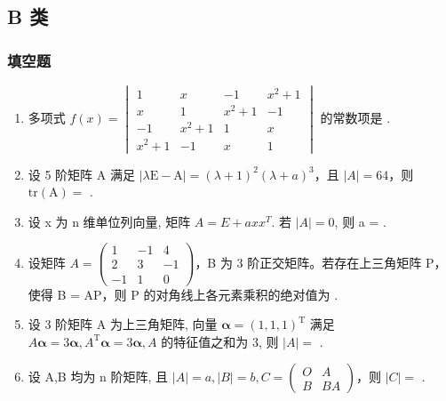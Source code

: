 \documentclass[12pt, a4paper]{ctexart}
\begin{document}
\subsection{B 类}

\subsubsection*{填空题}

\begin{enumerate}
    \item 多项式 $ f(x)=\begin{vmatrix}1&x&-1&x^{2}+1\\x&1&x^{2}+1&-1\\-1&x^{2}+1&1&x\\x^{2}+1&-1&x&1\end{vmatrix} $ 的常数项是 \underline{\hspace{2cm}}.

    \item 设 5 阶矩阵 A 满足 $ \left|\lambda\mathrm{E}-\mathrm{A}\right|=\left(\lambda+1\right)^{2}\left(\lambda+a\right)^{3} $，且 $ \left|A\right|=64 $，则 $ \mathrm{tr}(\mathrm{A})= $ \underline{\hspace{2cm}}.

    \item 设 x 为 n 维单位列向量, 矩阵 $ A = E + a x x^{T} $. 若 $ |A| = 0 $, 则 a = \underline{\hspace{2cm}}.

    \item 设矩阵 $ A = \begin{pmatrix} 1 & -1 & 4 \\ 2 & 3 & -1 \\ -1 & 1 & 0 \end{pmatrix} $，B 为 3 阶正交矩阵。若存在上三角矩阵 P，使得 B = AP，则 P 的对角线上各元素乘积的绝对值为 \underline{\hspace{2cm}}.

    \item 设 3 阶矩阵 A 为上三角矩阵, 向量 $ \boldsymbol{\alpha}=(1,1,1)^{\mathrm{T}} $ 满足 $ A\boldsymbol{\alpha}=3\boldsymbol{\alpha}, A^{\mathrm{T}}\boldsymbol{\alpha}=3\boldsymbol{\alpha}, A $ 的特征值之和为 3, 则 $ |A|= $ \underline{\hspace{2cm}}.

    \item 设 A,B 均为 n 阶矩阵, 且 $ \left|A\right|=a,\left|B\right|=b,C=\begin{pmatrix}O&A\\ B&BA\end{pmatrix} $，则 $ \left|C\right|= $ \underline{\hspace{2cm}}.


\end{enumerate}
\end{document}
